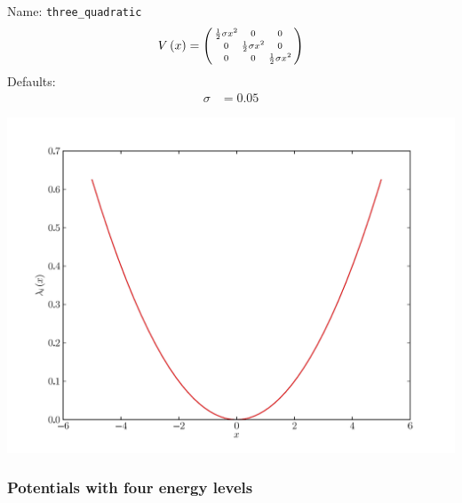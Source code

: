 \documentclass[a4paper,10pt]{report}
\begin{document}
\begin{minipage}{0.5\linewidth}
  Name:    \texttt{three\_quadratic}
  \begin{equation*}
    V\left( x \right) = \left(\begin{smallmatrix}\frac{1}{2} \sigma x^{2} & 0 & 0\\0 & \frac{1}{2} \sigma x^{2} & 0\\0 & 0 & \frac{1}{2} \sigma x^{2}\end{smallmatrix}\right)
  \end{equation*}
  Defaults:
  \begin{align*}
    \sigma & = 0.05
  \end{align*}
\end{minipage}
\begin{minipage}{0.5\linewidth}
  \begin{center}
    \includegraphics[scale=0.25]{./fig/three_quadratic.pdf}
  \end{center}
\end{minipage}


\subsubsection{Potentials with four energy levels}
\end{document}
